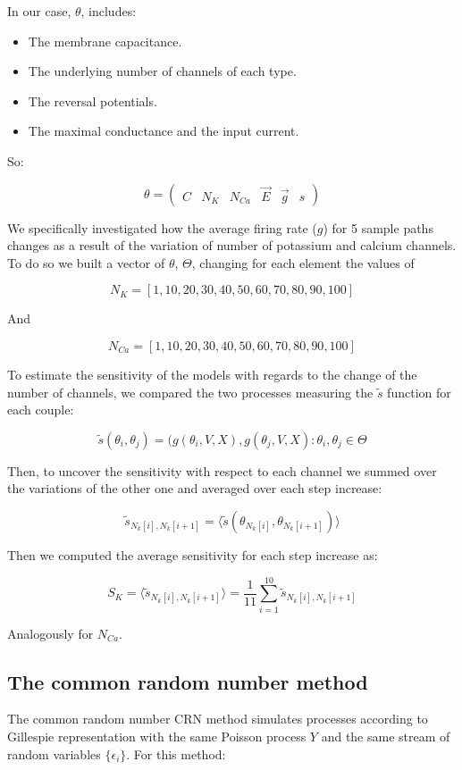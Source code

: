 In our case, ${\theta}$, includes:

\begin{itemize}
	\item The membrane capacitance.
	\item The underlying number of channels of each type.
	\item The reversal potentials.
	\item The maximal conductance and the input current.
\end{itemize}

So:

$$\theta = \begin{pmatrix} C & N_{K} & N_{Ca} & \vec{E} & \vec{g} & s\end{pmatrix}$$

We specifically investigated how the average firing rate ($g$) for 5 sample paths changes as a result of the variation of number of potassium and calcium channels.
To do so we built a vector of $\theta$, $\Theta$, changing for each element the values of

$$N_K = [1, 10, 20, 30, 40, 50, 60, 70, 80, 90, 100]$$

And

$$N_{Ca} = [1, 10, 20, 30, 40, 50, 60, 70, 80, 90, 100]$$

To estimate the sensitivity of the models with regards to the change of the number of channels, we compared the two processes measuring the $\tilde{s}$ function for each couple:

$$\tilde{s}(\theta_i, \theta_j) = (g(\theta_i, V, X), g(\theta_j, V, X): \theta_i, \theta_j\in \Theta$$

Then, to uncover the sensitivity with respect to each channel we summed over the variations of the other one and averaged over each step increase:

$$\tilde{s}_{N_k[i], N_k[i+1]} = \langle\tilde{s}(\theta_{N_k[i]}, \theta_{N_k[i+1]})\rangle$$

Then we computed the average sensitivity for each step increase as:

$$S_K = \langle\tilde{s}_{N_k[i], N_k[i+1]}\rangle = \frac{1}{11}\sum\limits_{i=1}^{10}\tilde{s}_{N_k[i], N_k[i+1]}$$

Analogously for $N_{Ca}$.

	\subsection{The common random number method}
	The common random number CRN method simulates processes according to Gillespie representation with the same Poisson process $Y$ and the same stream of random variables $\{\epsilon_i\}$. For this method:


